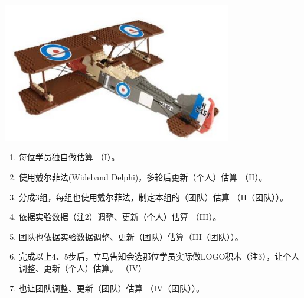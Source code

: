 
\includegraphics[width=10cm]{Lego1.jpg}

\begin{enumerate}
\tightlist
\item
  每位学员独自做估算 （I）。
\item
  使用戴尔菲法(Wideband Delphi)，多轮后更新（个人）估算 （II）。
\item
  分成3组，每组也使用戴尔菲法，制定本组的（团队）估算 （II（团队））。
\item
  依据实验数据（注2）调整、更新（个人）估算 （III）。
\item
  团队也依据实验数据调整、更新（团队）估算（III（团队））。
\item
  完成以上4、5步后，立马告知会选那位学员实际做LOGO积木（注3），让个人调整、更新（个人）估算。
  （IV）
\item
  也让团队调整、更新（团队）估算 （IV（团队））。
\end{enumerate}

